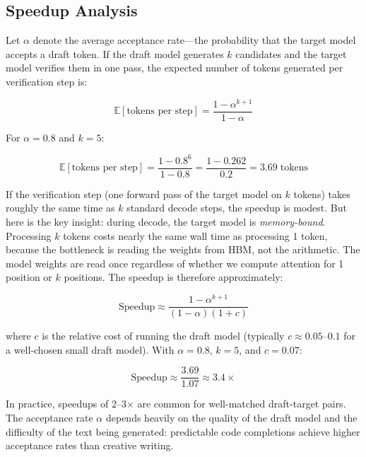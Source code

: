 \subsection{Speedup Analysis}

Let $\alpha$ denote the average acceptance rate---the probability that the target model accepts a draft token. If the draft model generates $k$ candidates and the target model verifies them in one pass, the expected number of tokens generated per verification step is:

\begin{equation}
\label{eq:spec-tokens}
\mathbb{E}[\text{tokens per step}] = \frac{1 - \alpha^{k+1}}{1 - \alpha}
\end{equation}

\noindent For $\alpha = 0.8$ and $k = 5$:

\begin{equation}
\mathbb{E}[\text{tokens per step}] = \frac{1 - 0.8^6}{1 - 0.8} = \frac{1 - 0.262}{0.2} = 3.69 \;\text{tokens}
\end{equation}

If the verification step (one forward pass of the target model on $k$ tokens) takes roughly the same time as $k$ standard decode steps, the speedup is modest. But here is the key insight: during decode, the target model is \emph{memory-bound}. Processing $k$ tokens costs nearly the same wall time as processing 1 token, because the bottleneck is reading the weights from HBM, not the arithmetic. The model weights are read once regardless of whether we compute attention for 1 position or $k$ positions. The speedup is therefore approximately:

\begin{equation}
\label{eq:spec-speedup}
\text{Speedup} \approx \frac{1 - \alpha^{k+1}}{(1 - \alpha)(1 + c)}
\end{equation}

\noindent where $c$ is the relative cost of running the draft model (typically $c \approx 0.05$--$0.1$ for a well-chosen small draft model). With $\alpha = 0.8$, $k = 5$, and $c = 0.07$:

\begin{equation}
\text{Speedup} \approx \frac{3.69}{1.07} \approx 3.4\times
\end{equation}

In practice, speedups of 2--3$\times$ are common for well-matched draft-target pairs. The acceptance rate $\alpha$ depends heavily on the quality of the draft model and the difficulty of the text being generated: predictable code completions achieve higher acceptance rates than creative writing.

